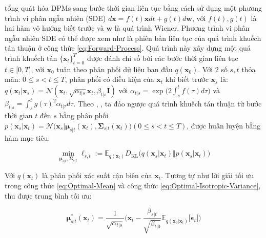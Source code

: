 \documentclass[14pt, a4paper]{article}
\numberwithin{equation}{section}
\numberwithin{figure}{section}
\numberwithin{dl}{section}
\numberwithin{md}{section}
\numberwithin{bd}{section}
\numberwithin{dn}{section}
\numberwithin{hq}{section}
\begin{document}
    \cite{song2020score} tổng quát hóa DPMs sang bước thời gian liên tục bằng cách sử dụng một phương trình vi phân ngẫu nhiên (SDE) $d \boldsymbol{x}=f(t) \boldsymbol{x} dt + g(t) d \boldsymbol{w}$,
    với $f(t), g(t)$ là hai hàm vô hướng biết trước và $\boldsymbol{w}$ là quá trình Wiener.
    Phương trình vi phân ngẫu nhiên SDE có thể được xem như là phiên bản liên tục của quá trình khuếch tán thuận ở công thức \ref{eq:Forward-Process}.
    Quá trình này xây dựng một quá trình khuếch tán $\lbrace \boldsymbol{x}_t \rbrace_{t=0}^T$ được đánh chỉ số bởi các bước thời gian liên tục $t \in \lbrack 0, T \rbrack$,
    với $\boldsymbol{x}_0$ tuân theo phân phối dữ liệu ban đầu $q(\boldsymbol{x}_0)$.
    Với 2 số $s, t$ thỏa mãn: $0 \leq s < t \leq T$, phân phối có điều kiện của $\boldsymbol{x}_t$ khi biết trước $\boldsymbol{x}_s$ là: $q(\boldsymbol{x}_t \vert \boldsymbol{x}_s)=\mathcal{N}(\boldsymbol{x}_t, \sqrt{\alpha_{t \vert s}} \boldsymbol{x}_t, \beta_{t \vert s} \boldsymbol{I})$ với $\alpha_{t \vert s}=\exp\Big(2\displaystyle\int_{s}^{t} f(\tau)d \tau \Big)$ và $\beta_{t \vert s}= \displaystyle\int_{s}^{t} g(\tau)^2 \alpha_{t \vert \tau} d \tau$.
    Theo \cite{bao2021analytic}, \cite{kingma2021variational}, ta đảo ngược quá trình khuếch tán thuận từ bước thời gian $t$ đến $s$ bằng phân phối $p(\boldsymbol{x}_s \vert \boldsymbol{x}_t) = \mathcal{N}\big( \boldsymbol{x}_s \vert \boldsymbol{\mu}_{s \vert t} (\boldsymbol{x}_t), \boldsymbol{\Sigma}_{s \vert t} (\boldsymbol{x}_t) \big) (0 \leq s < t \leq T)$, được huấn luyện bằng hàm mục tiêu:

    \begin{equation}
        \min_{\boldsymbol{\mu}_{s \vert t}, \boldsymbol{\Sigma}_{s \vert t}} \ell_{s, t} := \mathbb{E}_{q(\boldsymbol{x}_t)} D_{\mathrm{KL}} \big( q(\boldsymbol{x}_s \vert \boldsymbol{x}_t) \Vert p(\boldsymbol{x}_s \vert \boldsymbol{x}_t) \big)
    \end{equation}
    
    Với $q(\boldsymbol{x}_t)$ là phân phối xác suất cận biên của $\boldsymbol{x}_t$. Tương tự như lời giải tối ưu trong công thức \ref{eq:Optimal-Mean} và công thức \ref{eq:Optimal-Isotropic-Variance}, \cite{bao2021analytic} thu được trung bình tối ưu:

    \begin{equation} \label{eq:Continuous-Optimal-Mean}
        \boldsymbol{\mu}_{s \vert t}^{\ast} (\boldsymbol{x}_t) = \dfrac{1}{\sqrt{\alpha_{t \vert s}}}\Big( \boldsymbol{x}_t - \dfrac{\beta_{s \vert t}}{\sqrt{\beta_{t \vert 0}}} \mathbb{E}_{q(\boldsymbol{x}_0 \vert \boldsymbol{x}_t)} \lbrack \boldsymbol{\epsilon}_t \rbrack \Big)
    \end{equation}
\end{document}
